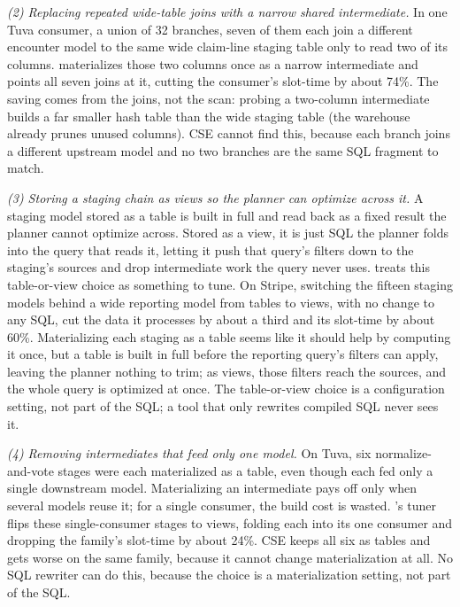 \emph{(2) Replacing repeated wide-table joins with a narrow shared intermediate.} In one Tuva consumer, a union of 32 branches, seven of them each join a different encounter model to the same wide claim-line staging table only to read two of its columns. \tool{} materializes those two columns once as a narrow intermediate and points all seven joins at it, cutting the consumer's slot-time by about 74\%. The saving comes from the joins, not the scan: probing a two-column intermediate builds a far smaller hash table than the wide staging table (the warehouse already prunes unused columns). CSE cannot find this, because each branch joins a different upstream model and no two branches are the same SQL fragment to match.

\emph{(3) Storing a staging chain as views so the planner can optimize across it.} A staging model stored as a table is built in full and read back as a fixed result the planner cannot optimize across. Stored as a view, it is just SQL the planner folds into the query that reads it, letting it push that query's filters down to the staging's sources and drop intermediate work the query never uses. \tool{} treats this table-or-view choice as something to tune. On Stripe, switching the fifteen staging models behind a wide reporting model from tables to views, with no change to any SQL, cut the data it processes by about a third and its slot-time by about 60\%. Materializing each staging as a table seems like it should help by computing it once, but a table is built in full before the reporting query's filters can apply, leaving the planner nothing to trim; as views, those filters reach the sources, and the whole query is optimized at once. The table-or-view choice is a configuration setting, not part of the SQL; a tool that only rewrites compiled SQL never sees it.






\emph{(4) Removing intermediates that feed only one model.} On Tuva, six normalize-and-vote stages were each materialized as a table, even though each fed only a single downstream model. Materializing an intermediate pays off only when several models reuse it; for a single consumer, the build cost is wasted. \tool{}'s tuner flips these single-consumer stages to views, folding each into its one consumer and dropping the family's slot-time by about 24\%.  CSE keeps all six as tables and gets worse on the same family, because it cannot change materialization at all. No SQL rewriter can do this, because the choice is a materialization setting, not part of the SQL.

